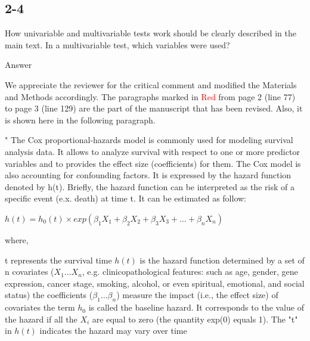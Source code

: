 \documentclass[preprint,12pt]{elsarticle}
\newenvironment{MyColorPar}[1]{%
    \leavevmode\color{#1}\ignorespaces%
}{%
}%
\begin{document}
\subsection*{2-4} %
How univariable and multivariable tests work should be clearly described in the main text. In a multivariable test, which variables were used?




%
\begin{MyColorPar}{blue}
Answer

We appreciate the reviewer for the critical comment and modified the Materials and Methods accordingly.
The paragraphs marked in \textcolor{red}{Red} from page 2 (line 77) to page 3 (line 129) are the part of the manuscript that has been revised. Also, it is shown here in the following paragraph.
\\[0.3cm]

\begin{MyColorPar}{red}
"
The Cox proportional-hazards model\cite{Cox1972}\cite{Andersen1982} is commonly used for modeling survival analysis data. It allows to analyze survival with respect to one or more predictor variables and to provides the effect size (coefficients) for them\cite{Bradburn2003b}. %
The Cox model is also accounting for confounding factors\cite{Magen2019}.
It is expressed by the hazard function denoted by h(t). Briefly, the hazard function can be interpreted as the risk of a specific event (e.x. death) at time t. It can be estimated as follow:

\begin{flushleft}

$h(t) = h_0(t) \times exp(\beta_1 X_1 + \beta_2 X_2 + \beta_3 X_3 + ... + \beta_n X_n)$\\[0.3cm]
\end{flushleft}
where,\\
\begin{outline} %
\1 t represents the survival time
\1 $h(t)$ is the hazard function determined by a set of n covariates ($X_1...X_n$, e.g. clinicopathological features: such as age, gender, gene expression, cancer stage, smoking, alcohol, or even spiritual, emotional, and social status)
\1 the coefficients ($\beta_1...\beta_n$) measure the impact (i.e., the effect size) of covariates
\1 the term $h_0$ is called the baseline hazard. It corresponds to the value of the hazard if all the $X_i$ are equal to zero (the quantity exp(0) equals 1). The "t" in $h(t)$ indicates the hazard may vary over time
\end{outline}


\end{MyColorPar}
\end{MyColorPar}
\end{document}
